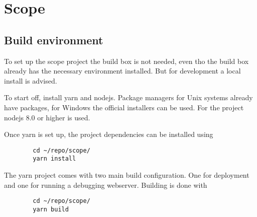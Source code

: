 
%
%
\chapter{Scope} %
\label{ch:devguide:scope}

\section{Build environment}

To set up  the scope project the build  box is not needed, even  tho the build
box already has the necessary environment installed.
But for development a local install is advised.

To  start off,  install yarn  and  nodejs. Package managers  for Unix  systems
already have  packages, for Windows  the official installers can  be used. For
the project nodejs 8.0 or higher is used.

Once yarn is set up, the project dependencies can be installed using

\begin{listing}
    \begin{verbatim}
        cd ~/repo/scope/
        yarn install
    \end{verbatim}
\end{listing}

The yarn project  comes with two main build  configuration. One for deployment
and one for running a debugging webserver. Building is done with

\begin{listing}
    \begin{verbatim}
        cd ~/repo/scope/
        yarn build
    \end{verbatim}
\end{listing}

